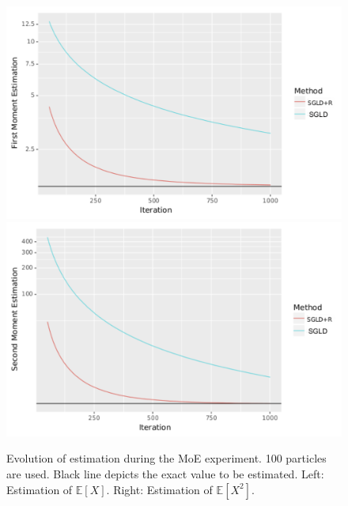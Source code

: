\begin{figure}[ht]
\begin{center}
\hspace{-0.5em}
  \includegraphics[width=\linewidth]{img/exp1.pdf}
\endminipage\hfill
{}
  \includegraphics[width=\linewidth]{img/exp2.pdf}
\endminipage
\end{center}
\caption{Evolution of estimation during the MoE experiment. 100 particles are used. Black line depicts the exact value to be estimated. Left: Estimation of $\mathbb{E}\left[X\right]$. Right: Estimation of $\mathbb{E}\left[X^2\right]$.}\label{fig:moe100}
\end{figure}





